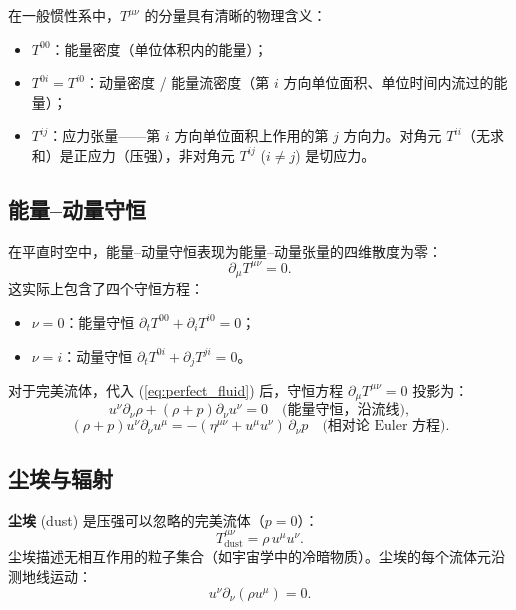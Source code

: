 \begin{note}[$T^{\mu\nu}$ 各分量的物理解释]
在一般惯性系中，$T^{\mu\nu}$ 的分量具有清晰的物理含义：
\begin{itemize}
    \item $T^{00}$：能量密度（单位体积内的能量）；
    \item $T^{0i} = T^{i0}$：动量密度 / 能量流密度（第 $i$ 方向单位面积、单位时间内流过的能量）；
    \item $T^{ij}$：应力张量——第 $i$ 方向单位面积上作用的第 $j$ 方向力。对角元 $T^{ii}$（无求和）是正应力（压强），非对角元 $T^{ij}$ ($i\neq j$) 是切应力。
\end{itemize}
\end{note}

\subsection{能量--动量守恒}

在平直时空中，能量--动量守恒表现为能量--动量张量的四维散度为零：
\begin{equation}\label{eq:conservation}
    \boxed{\partial_\mu T^{\mu\nu} = 0}.
\end{equation}
这实际上包含了四个守恒方程：
\begin{itemize}
    \item $\nu = 0$：能量守恒 $\partial_t T^{00} + \partial_i T^{i0} = 0$；
    \item $\nu = i$：动量守恒 $\partial_t T^{0i} + \partial_j T^{ji} = 0$。
\end{itemize}

对于完美流体，代入 (\ref{eq:perfect_fluid}) 后，守恒方程 $\partial_\mu T^{\mu\nu} = 0$ 投影为：
\begin{equation}
    u^\nu \partial_\nu \rho + (\rho + p)\partial_\nu u^\nu = 0 \quad\text{(能量守恒，沿流线)},
\end{equation}
\begin{equation}
    (\rho + p) u^\nu \partial_\nu u^\mu = -(\eta^{\mu\nu} + u^\mu u^\nu)\,\partial_\nu p \quad\text{(相对论 Euler 方程)}.
\end{equation}

\subsection{尘埃与辐射}

\begin{definition}[尘埃]
\textbf{尘埃} (dust) 是压强可以忽略的完美流体（$p=0$）：
\begin{equation}
    T^{\mu\nu}_{\text{dust}} = \rho\, u^\mu u^\nu.
\end{equation}
尘埃描述无相互作用的粒子集合（如宇宙学中的冷暗物质）。尘埃的每个流体元沿测地线运动：
\begin{equation}
    u^\nu \partial_\nu (\rho u^\mu) = 0.
\end{equation}
\end{definition}

